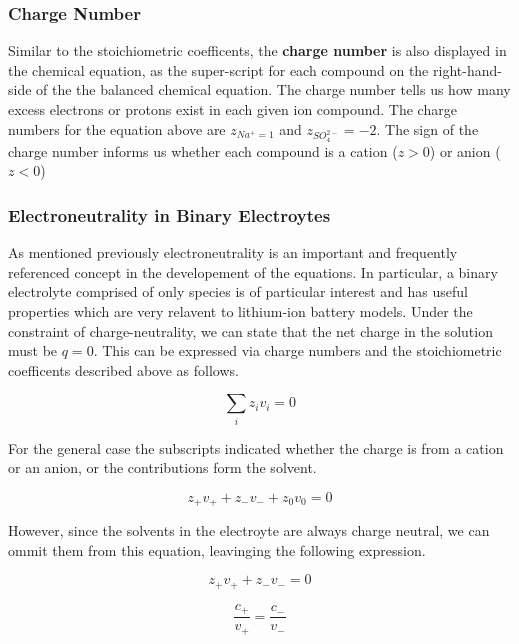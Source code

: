 \documentclass[lettersize,journal]{IEEEtran}
\begin{document}
\subsubsection{ Charge Number }

Similar to the stoichiometric coefficents, the \textbf{charge number} is also displayed in the chemical equation, as the super-script for each compound on the right-hand-side of the the balanced chemical equation. The charge number tells us how many excess electrons or protons exist in each given ion compound. The charge numbers for the equation above are $z_{Na^{+} = 1}$ and $ z_{SO_{4}^{2-}} = -2 $. The sign of the charge number informs us whether each compound is a cation ($z>0$) or anion ($z < 0 $) \\

\subsubsection{ Electroneutrality in Binary Electroytes }
As mentioned previously electroneutrality is an important and frequently referenced concept in the developement of the equations. In particular, a binary electrolyte comprised of only species is of particular interest and has useful properties which are very relavent to lithium-ion battery models. Under the constraint of charge-neutrality, we can state that the net charge in the solution must be $q = 0$. This can be expressed via charge numbers and the stoichiometric coefficents described above as follows.

\begin{equation}
  \sum_{i} z_{i} v_{i}=0
\end{equation}

For the general case the subscripts indicated whether the charge is from a cation or an anion, or the contributions form the solvent.

\begin{equation}
  z_{+} v_{+}+z_{-} v_{-}+z_{0} v_{0}=0
\end{equation}

However, since the solvents in the electroyte are always charge neutral, we can ommit them from this equation, leavinging the following expression.


\begin{equation}
  z_{+} v_{+}+z_{-} v_{-}=0
\end{equation}

\begin{equation}
  \frac{c_{+}}{v_{+}}=\frac{c_{-}}{v_{-}}
\end{equation}
\end{document}
